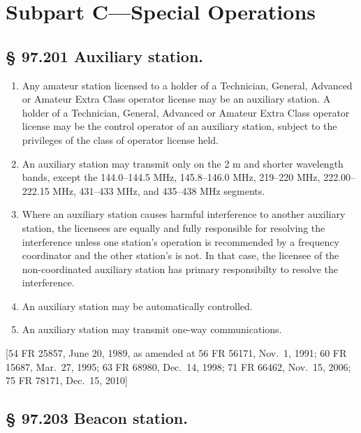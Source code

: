 \documentclass[
  letterpaper,
  DIV=11,
  numbers=noendperiod]{scrreport}
\begin{document}
\hypertarget{subpart-cspecial-operations}{%
\section*{Subpart C---Special
Operations}\label{subpart-cspecial-operations}}


\hypertarget{auxiliary-station.}{%
\subsection*{§ 97.201 Auxiliary station.}\label{auxiliary-station.}}

\begin{enumerate}
\def\labelenumi{(\alph{enumi})}
\item
  Any amateur station licensed to a holder of a Technician, General,
  Advanced or Amateur Extra Class operator license may be an auxiliary
  station. A holder of a Technician, General, Advanced or Amateur Extra
  Class operator license may be the control operator of an auxiliary
  station, subject to the privileges of the class of operator license
  held.
\item
  An auxiliary station may transmit only on the 2 m and shorter
  wavelength bands, except the 144.0--144.5 MHz, 145.8--146.0 MHz,
  219--220 MHz, 222.00--222.15 MHz, 431--433 MHz, and 435--438 MHz
  segments.
\item
  Where an auxiliary station causes harmful interference to another
  auxiliary station, the licensees are equally and fully responsible for
  resolving the interference unless one station's operation is
  recommended by a frequency coordinator and the other station's is not.
  In that case, the licensee of the non-coordinated auxiliary station
  has primary responsibilty to resolve the interference.
\item
  An auxiliary station may be automatically controlled.
\item
  An auxiliary station may transmit one-way communications.
\end{enumerate}

{[}54 FR 25857, June 20, 1989, as amended at 56 FR 56171, Nov.~1, 1991;
60 FR 15687, Mar.~27, 1995; 63 FR 68980, Dec.~14, 1998; 71 FR 66462,
Nov.~15, 2006; 75 FR 78171, Dec.~15, 2010{]}

\hypertarget{beacon-station.}{%
\subsection*{§ 97.203 Beacon station.}\label{beacon-station.}}
\end{document}
